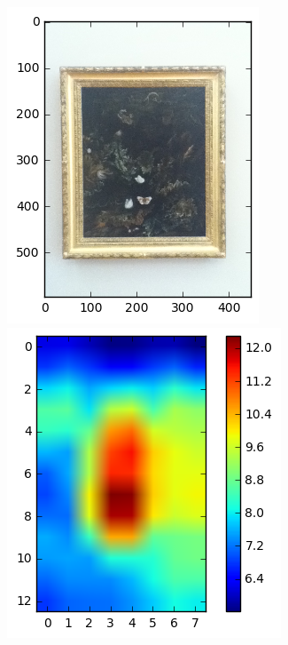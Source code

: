 \begin{figure}
  \begin{minipage}[c]{.33\linewidth}
    \includegraphics[width=\linewidth]{figures/sample2_5P-0508.png}
  \end{minipage} \hfill
  \begin{minipage}[c]{.33\linewidth}
    \includegraphics[width=\linewidth]{figures/sample2_heatmap.png}

\end{minipage}
\end{figure}
